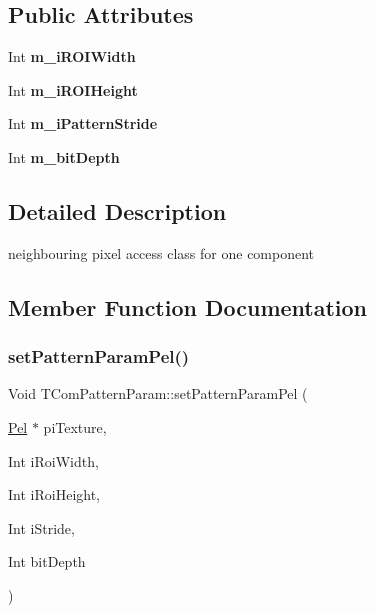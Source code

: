 \subsection*{Public Attributes}
\begin{DoxyCompactItemize}
\item 
\mbox{\label{class_t_com_pattern_param_a8877895cdf04db4acca21164b7c8cd73}} 
Int {\bfseries m\+\_\+i\+R\+O\+I\+Width}
\item 
\mbox{\label{class_t_com_pattern_param_a087ad4d7e93ceb327810b9390d8e8eab}} 
Int {\bfseries m\+\_\+i\+R\+O\+I\+Height}
\item 
\mbox{\label{class_t_com_pattern_param_a211dff0bf26078ab154d593787d25305}} 
Int {\bfseries m\+\_\+i\+Pattern\+Stride}
\item 
\mbox{\label{class_t_com_pattern_param_a86928b2b825b20dbce55dce18879c299}} 
Int {\bfseries m\+\_\+bit\+Depth}
\end{DoxyCompactItemize}


\subsection{Detailed Description}
neighbouring pixel access class for one component 

\subsection{Member Function Documentation}
\mbox{\label{class_t_com_pattern_param_a0ca8ed93aa14457531834f4d9bcb4bf6}} 
\subsubsection{\texorpdfstring{set\+Pattern\+Param\+Pel()}{setPatternParamPel()}}
{\footnotesize\ttfamily Void T\+Com\+Pattern\+Param\+::set\+Pattern\+Param\+Pel (\begin{DoxyParamCaption}\item[{\hyperlink{_type_def_8h_af92141699657699b4b547be0c8517541}{Pel} $\ast$}]{pi\+Texture,  }\item[{Int}]{i\+Roi\+Width,  }\item[{Int}]{i\+Roi\+Height,  }\item[{Int}]{i\+Stride,  }\item[{Int}]{bit\+Depth }\end{DoxyParamCaption})}



